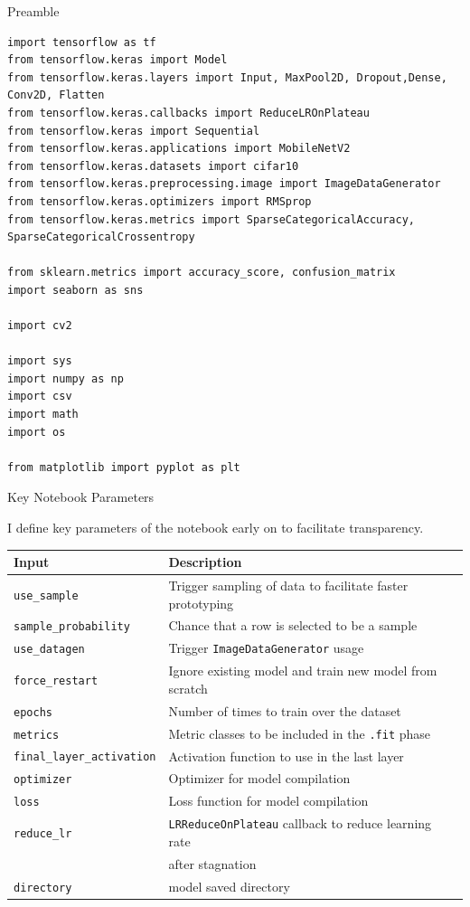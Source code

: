 \documentclass[12pt, letterpaper]{article}
\begin{document}
{\large Preamble}

\begin{mdframed}[backgroundcolor=bg]
\begin{verbatim}
import tensorflow as tf
from tensorflow.keras import Model
from tensorflow.keras.layers import Input, MaxPool2D, Dropout,Dense, Conv2D, Flatten
from tensorflow.keras.callbacks import ReduceLROnPlateau
from tensorflow.keras import Sequential
from tensorflow.keras.applications import MobileNetV2
from tensorflow.keras.datasets import cifar10
from tensorflow.keras.preprocessing.image import ImageDataGenerator
from tensorflow.keras.optimizers import RMSprop
from tensorflow.keras.metrics import SparseCategoricalAccuracy, SparseCategoricalCrossentropy

from sklearn.metrics import accuracy_score, confusion_matrix
import seaborn as sns

import cv2

import sys
import numpy as np
import csv
import math
import os

from matplotlib import pyplot as plt
\end{verbatim}
\end{mdframed}

{\large Key Notebook Parameters}

I define key parameters of the notebook early on to facilitate transparency.

\begin{tabular}{ll}
\hline
\textbf{Input} & \textbf{Description}\\
\hline
\texttt{use\_sample}                &Trigger sampling of data to facilitate faster prototyping\\
\texttt{sample\_probability}        &Chance that a row is selected to be a sample\\
\texttt{use\_datagen}               &Trigger \texttt{ImageDataGenerator} usage\\
\texttt{force\_restart}             &Ignore existing model and train new model from scratch\\
\texttt{epochs}                     &Number of times to train over the dataset\\
\texttt{metrics}                    &Metric classes to be included in the \texttt{.fit\(\)} phase\\
\texttt{final\_layer\_activation}   &Activation function to use in the last layer\\
\texttt{optimizer}                  &Optimizer for model compilation\\
\texttt{loss}                       &Loss function for model compilation\\
\texttt{reduce\_lr}                 &\texttt{LRReduceOnPlateau} callback to reduce learning rate \\
&after stagnation\\
\texttt{directory}                  &model saved directory
\end{tabular}
\end{document}
